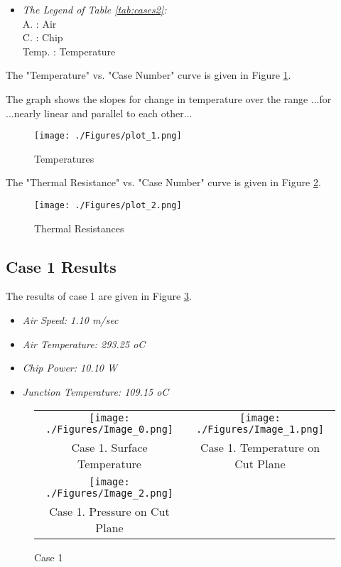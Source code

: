 \documentclass[letterpaper,12pt]{article}
\begin{document}
\begin{itemize}
\item{\emph{The Legend of Table \ref{tab:cases2}:\\}}
A. : Air\\C. : Chip\\Temp. : Temperature
\end{itemize}
\vfill
\newpage
\clearpage
The "Temperature" vs. "Case Number" curve is given in Figure \ref{fig:tempcase}.



The graph shows the slopes for change in temperature over the range ...for ...nearly linear and parallel to each other...
\\
\begin{figure}[!h!tbp]
\begin{center}
\texttt{[image: ./Figures/plot\_1.png]}
\caption{\label{fig:tempcase}Temperatures}
\end{center}
\end{figure}
\vfill
\newpage
\clearpage
The "Thermal Resistance" vs. "Case Number" curve is given in Figure \ref{fig:trcase}.\\
\begin{figure}[!h!tbp]
\begin{center}
\texttt{[image: ./Figures/plot\_2.png]}
\caption{\label{fig:trcase}Thermal Resistances}
\end{center}
\end{figure}
\vfill
\newpage
\clearpage
\subsection{Case 1 Results}
The results of case 1 are given in Figure \ref{fig:case 1}.\\
\begin{itemize}
\item{\emph{Air Speed: 1.10 m/sec}}

\item{\emph{Air Temperature: 293.25 oC}}

\item{\emph{Chip Power: 10.10 W}}

\item{\emph{Junction Temperature: 109.15 oC}}

\end{itemize}
\begin{figure}[!h!tbp]
\begin{center}
\begin{tabular}{ c c }
\texttt{[image: ./Figures/Image\_0.png]}
 & \texttt{[image: ./Figures/Image\_1.png]}
 \\ Case 1. Surface Temperature & Case 1. Temperature on Cut Plane \\
\texttt{[image: ./Figures/Image\_2.png]}
 &  \\ Case 1. Pressure on Cut Plane &  \\
\end{tabular}
\caption{\label{fig:case 1}
Case 1}
\end{center}
\end{figure}
\vfill
\newpage
\clearpage
\end{document}
